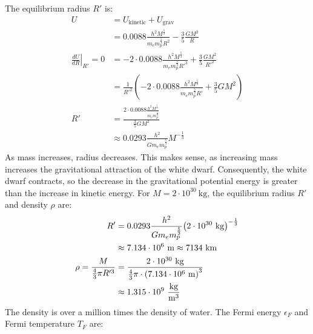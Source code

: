 \documentclass{article}
\begin{document}
The equilibrium radius $R'$ is:
\begin{equation}
    \begin{split}
        U & = U_{\text{kinetic}} + U_{\text{grav}} \\
        & = 0.0088\frac{h^2M^{\frac{5}{3}}}{m_em_p^{\frac{5}{3}}R^2} - \frac{3}{5}\frac{GM^2}{R} \\
        \left.\frac{dU}{dR}\right\vert_{R'} = 0 & = -2 \cdot 0.0088\frac{h^2M^{\frac{5}{3}}}{m_em_p^{\frac{5}{3}}R'^3} + \frac{3}{5}\frac{GM^2}{R'^2} \\
        & = \frac{1}{R'^2}(-2 \cdot 0.0088\frac{h^2M^{\frac{5}{3}}}{m_em_p^{\frac{5}{3}}R'} + \frac{3}{5}GM^2)\\
        R' & = \frac{2 \cdot 0.0088\frac{h^2M^{\frac{5}{3}}}{m_em_p^{\frac{5}{3}}}}{\frac{3}{5}GM^2} \\
        & \approx 0.0293\frac{h^2}{Gm_em_p^{\frac{5}{3}}}M^{-\frac{1}{3}}
    \end{split}
\end{equation}
As mass increases, radius decreases. This makes sense, as increasing mass increases the gravitational attraction of the white dwarf. Consequently, the white dwarf contracts, so the decrease in the gravitational potential energy is greater than the increase in kinetic energy.
For $M = 2 \cdot 10^{30}~\unit{\kilo\gram}$, the equilibrium radius $R'$ and density $\rho$ are:
\begin{equation}
    \begin{split}
        R' & = 0.0293\frac{h^2}{Gm_em_p^{\frac{5}{3}}}{\left(2 \cdot 10^{30}~\unit{\kilo\gram}\right)}^{-\frac{1}{3}} \\
        & \approx 7.134 \cdot 10^{6}~\unit{\meter} \approx 7134~\unit{\kilo\meter} \\
        \rho = \frac{M}{\frac{4}{3}\pi R'^3} & = \frac{2 \cdot 10^{30}~\unit{\kilo\gram}}{\frac{4}{3}\pi \cdot {\left(7.134 \cdot 10^{6}~\unit{\meter}\right)}^3} \\
        & \approx 1.315 \cdot 10^9~\unit{\frac{\kilo\gram}{\meter\cubed}}
    \end{split}
\end{equation}
The density is over a million times the density of water.
The Fermi energy $\epsilon_F$ and Fermi temperature $T_F$ are:
\end{document}
